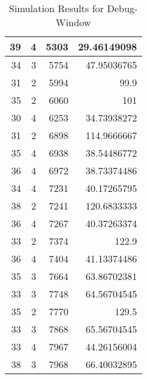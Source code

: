 \begin{table}[]
\begin{tabular}{|r|r|r|r|}
39 & 4 & 5303 & 29.46149098 \\ \hline
34 & 3 & 5754 & 47.95036765 \\ \hline
31 & 2 & 5994 & 99.9 \\ \hline
35 & 2 & 6060 & 101 \\ \hline
30 & 4 & 6253 & 34.73938272 \\ \hline
31 & 2 & 6898 & 114.9666667 \\ \hline
35 & 4 & 6938 & 38.54486772 \\ \hline
36 & 4 & 6972 & 38.73374486 \\ \hline
34 & 4 & 7231 & 40.17265795 \\ \hline
38 & 2 & 7241 & 120.6833333 \\ \hline
36 & 4 & 7267 & 40.37263374 \\ \hline
33 & 2 & 7374 & 122.9 \\ \hline
36 & 4 & 7404 & 41.13374486 \\ \hline
35 & 3 & 7664 & 63.86702381 \\ \hline
33 & 3 & 7748 & 64.56704545 \\ \hline
35 & 2 & 7770 & 129.5 \\ \hline
33 & 3 & 7868 & 65.56704545 \\ \hline
33 & 4 & 7967 & 44.26156004 \\ \hline
38 & 3 & 7968 & 66.40032895 \\ \hline
\end{tabular}
\caption{Simulation Results for Debug-Window}
\label{tab:simulation}
\end{table}
\fi	